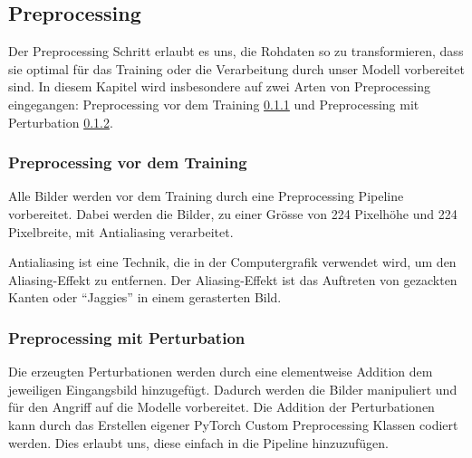 \subsection{Preprocessing}  \label{chap:preprocessing}

Der Preprocessing Schritt erlaubt es uns, die Rohdaten so zu transformieren, dass sie optimal für das Training oder die Verarbeitung durch unser Modell vorbereitet sind. In diesem Kapitel wird insbesondere auf zwei Arten von Preprocessing eingegangen: Preprocessing vor dem Training \ref{chap:Preprocessing vor dem Training} und Preprocessing mit Perturbation \ref{chap:Preprocessing mit Perturbation}.

\subsubsection{Preprocessing vor dem Training} \label{chap:Preprocessing vor dem Training}

Alle Bilder werden vor dem Training durch eine Preprocessing Pipeline vorbereitet. Dabei werden die Bilder, zu einer Grösse von 224 Pixelhöhe und 224 Pixelbreite, mit Antialiasing verarbeitet. 

Antialiasing ist eine Technik, die in der Computergrafik verwendet wird, um den Aliasing-Effekt zu entfernen. Der Aliasing-Effekt ist das Auftreten von gezackten Kanten oder "`Jaggies"' in einem gerasterten Bild.

\subsubsection{Preprocessing mit Perturbation} \label{chap:Preprocessing mit Perturbation}

Die erzeugten Perturbationen werden durch eine elementweise Addition dem jeweiligen Eingangsbild hinzugefügt. Dadurch werden die Bilder manipuliert und für den Angriff auf die Modelle vorbereitet. Die Addition der Perturbationen kann durch das Erstellen eigener PyTorch Custom Preprocessing Klassen codiert werden. Dies erlaubt uns, diese einfach in die Pipeline hinzuzufügen. 



